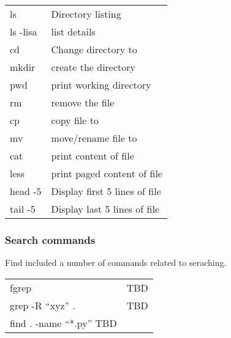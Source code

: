 \noindent\begin{tabulary}{\linewidth}{|L|L|}
\hline
{}\relax &\relax \\
\hline
ls
&
Directory listing
\\
\hline
ls -lisa
&
list details
\\
\hline
cd 
&
Change directory to 
\\
\hline
mkdir 
&
create the directory
\\
\hline
pwd
&
print working directory
\\
\hline
rm 
&
remove the file
\\
\hline
cp  
&
copy file  to 
\\
\hline
mv  
&
move/rename file  to 
\\
\hline
cat 
&
print content of file
\\
\hline
less 
&
print paged content of file 
\\
\hline
head -5 
&
Display first 5 lines of file 
\\
\hline
tail -5 
&
Display last 5 lines of file 
\\
\hline\end{tabulary}



\subsubsection{Search commands}
\label{\detokenize{lesson/linux/linux:search-commands}}
Find included a number of commands related to seraching.

\noindent\begin{tabulary}{\linewidth}{|L|L|}
\hline
{}\relax &\relax \\
\hline
fgrep
&
TBD
\\
\hline
grep -R ``xyz'' .
&
TBD
\\
\hline
find . -name ``*.py'' \textbar{} TBD \textbar{}
&\\
\hline\end{tabulary}



